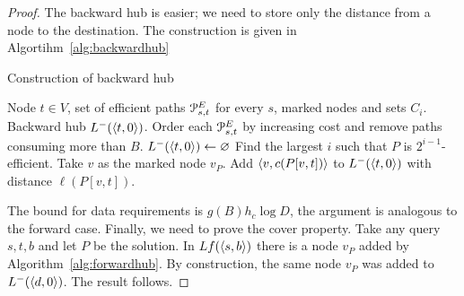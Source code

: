 \begin{proof}
The backward hub is easier; we need to store only the distance from a node to the destination.
The construction is given in Algortihm~\ref{alg:backwardhub}
\begin{algorithm}
\caption{Construction of backward hub}\label{alg:backwardhub}
\begin{algorithmic}[1]
\Require Node $t\in V$, set of efficient paths $\mathcal{P}_{s,t}^E$ for every $s$, marked nodes and sets $C_i$.
\Ensure Backward hub $L^-(\langle t,0\rangle)$.
\State Order each $\mathcal{P}_{s,t}^E$ by increasing cost and remove paths consuming more than $B$.
\State $L^-(\langle t,0\rangle)\gets \varnothing$
		\State Find the largest $i$ such that $P$ is $2^{i-1}$-efficient.
		\State Take $v$ as the marked node $v_P$.
		\State Add $\langle v,c(P[v,t])\rangle$ to $L^-(\langle t,0\rangle)$ with distance $\ell(P[v,t])$.
	\EndFor
\EndFor
\end{algorithmic}
\end{algorithm}

The bound for data requirements is $g(B) h_c\log D$, the argument is analogous to the forward case.
Finally, we need to prove the cover property.
Take any query $s,t,b$ and let $P$ be the solution.
In $Lf(\langle s,b\rangle)$ there is a node $v_P$ added by Algorithm~\ref{alg:forwardhub}.
By construction, the same node $v_P$ was added to $L^-(\langle d,0\rangle)$.
The result follows.
\end{proof}
